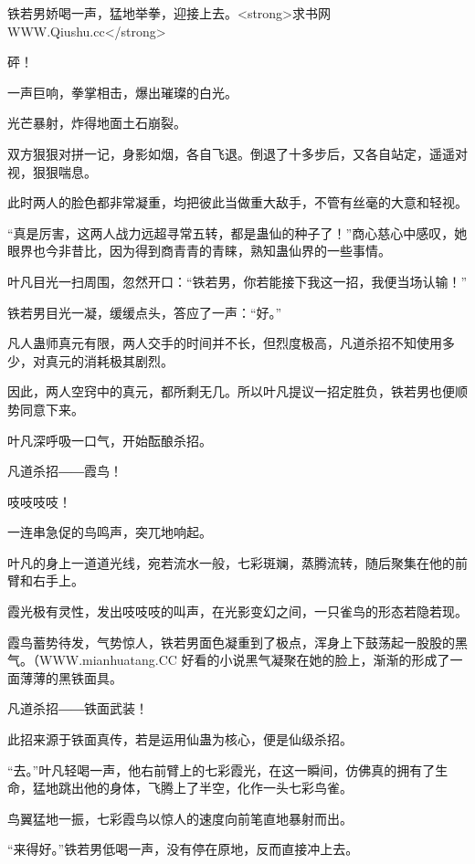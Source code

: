 
\begin{this_body}

铁若男娇喝一声，猛地举拳，迎接上去。<strong>求书网WWW.Qiushu.cc</strong>

砰！

一声巨响，拳掌相击，爆出璀璨的白光。

光芒暴射，炸得地面土石崩裂。

双方狠狠对拼一记，身影如烟，各自飞退。倒退了十多步后，又各自站定，遥遥对视，狠狠喘息。

此时两人的脸色都非常凝重，均把彼此当做重大敌手，不管有丝毫的大意和轻视。

“真是厉害，这两人战力远超寻常五转，都是蛊仙的种子了！”商心慈心中感叹，她眼界也今非昔比，因为得到商青青的青睐，熟知蛊仙界的一些事情。

叶凡目光一扫周围，忽然开口：“铁若男，你若能接下我这一招，我便当场认输！”

铁若男目光一凝，缓缓点头，答应了一声：“好。”

凡人蛊师真元有限，两人交手的时间并不长，但烈度极高，凡道杀招不知使用多少，对真元的消耗极其剧烈。

因此，两人空窍中的真元，都所剩无几。所以叶凡提议一招定胜负，铁若男也便顺势同意下来。

叶凡深呼吸一口气，开始酝酿杀招。

凡道杀招――霞鸟！

吱吱吱吱！

一连串急促的鸟鸣声，突兀地响起。

叶凡的身上一道道光线，宛若流水一般，七彩斑斓，蒸腾流转，随后聚集在他的前臂和右手上。

霞光极有灵性，发出吱吱吱的叫声，在光影变幻之间，一只雀鸟的形态若隐若现。

霞鸟蓄势待发，气势惊人，铁若男面色凝重到了极点，浑身上下鼓荡起一股股的黑气。（WWW.mianhuatang.CC 好看的小说黑气凝聚在她的脸上，渐渐的形成了一面薄薄的黑铁面具。

凡道杀招――铁面武装！

此招来源于铁面真传，若是运用仙蛊为核心，便是仙级杀招。

“去。”叶凡轻喝一声，他右前臂上的七彩霞光，在这一瞬间，仿佛真的拥有了生命，猛地跳出他的身体，飞腾上了半空，化作一头七彩鸟雀。

鸟翼猛地一振，七彩霞鸟以惊人的速度向前笔直地暴射而出。

“来得好。”铁若男低喝一声，没有停在原地，反而直接冲上去。


\end{this_body}
